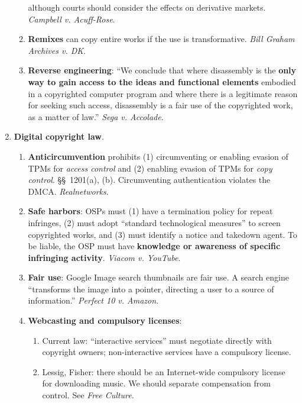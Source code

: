 \begin{enumerate}
\begin{enumerate}
        although courts should consider the effects on derivative markets. 
        \emph{Campbell v. Acuff-Rose}.
        \item \textbf{Remixes} can copy entire works if the use is 
        transformative. \emph{Bill Graham Archives v. DK}.
        \item \textbf{Reverse engineering}: ``We conclude that where 
        disassembly is the \textbf{only way to gain access to the ideas and 
        functional elements} embodied in a copyrighted computer program and 
        where there is a legitimate reason for seeking such access, 
        disassembly is a fair use of the copyrighted work, as a matter of 
        law.'' \emph{Sega v. Accolade}.
    \end{enumerate}
    \item \textbf{Digital copyright law}.
    \begin{enumerate}
        \item \textbf{Anticircumvention} prohibits (1) circumventing or 
        enabling evasion of TPMs for \emph{access control} and (2) enabling 
        evasion of TPMs for \emph{copy control}. \S\S\ 1201(a), (b). 
        Circumventing authentication violates the DMCA. \emph{Realnetworks}.
        \item \textbf{Safe harbors}: OSPs must (1) have a termination policy 
        for repeat infringes, (2) must adopt ``standard technological 
        measures'' to screen copyrighted works, and (3) must identify a notice 
        and takedown agent. To be liable, the OSP must have \textbf{knowledge 
        or awareness of specific infringing activity}. \emph{Viacom v. 
        YouTube}.
        \item \textbf{Fair use}: Google Image search thumbnails are fair use. 
        A search engine ``transforms the image into a pointer, directing a 
        user to a source of information.'' \emph{Perfect 10 v. Amazon}.
        \item \textbf{Webcasting and compulsory licenses}:
        \begin{enumerate}
            \item Current law: ``interactive services'' must negotiate 
            directly with copyright owners; non-interactive services have a 
            compulsory license.
            \item Lessig, Fisher: there should be an Internet-wide compulsory 
            license for downloading music. We should separate compensation 
            from control. See \emph{Free Culture}.

\end{enumerate}
\end{enumerate}
\end{enumerate}
